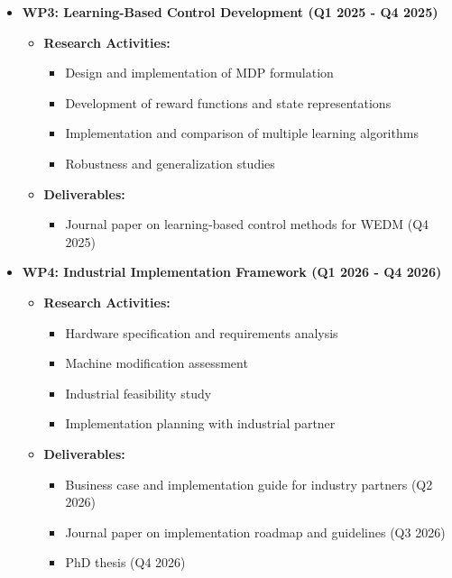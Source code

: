 \documentclass[11pt]{article}
\begin{document}
\begin{itemize}
    \item \textbf{WP3: Learning-Based Control Development (Q1 2025 - Q4 2025)}
        \begin{itemize}
            \item \textbf{Research Activities:}
                \begin{itemize}
                    \item Design and implementation of MDP formulation
                    \item Development of reward functions and state representations
                    \item Implementation and comparison of multiple learning algorithms
                    \item Robustness and generalization studies
                \end{itemize}
            \item \textbf{Deliverables:}
                \begin{itemize}
                    \item Journal paper on learning-based control methods for WEDM (Q4 2025)
                \end{itemize}
        \end{itemize}

    \item \textbf{WP4: Industrial Implementation Framework (Q1 2026 - Q4 2026)}
        \begin{itemize}
            \item \textbf{Research Activities:}
                \begin{itemize}
                    \item Hardware specification and requirements analysis
                    \item Machine modification assessment
                    \item Industrial feasibility study
                    \item Implementation planning with industrial partner
                \end{itemize}
            \item \textbf{Deliverables:}
                \begin{itemize}
                    \item Business case and implementation guide for industry partners (Q2 2026)
                    \item Journal paper on implementation roadmap and guidelines (Q3 2026)
                    \item PhD thesis (Q4 2026)
                \end{itemize}
        \end{itemize}
\end{itemize}


\printbibliography
\end{document}
